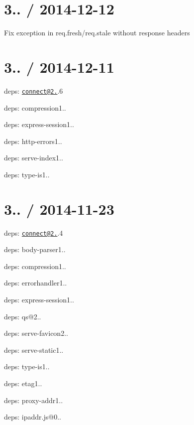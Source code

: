 {\ttfamily \section*{3.. / 2014-\/12-\/12 }}

{\ttfamily }

{\ttfamily 
\begin{DoxyItemize}
\item Fix exception in {\ttfamily req.\+fresh}/{\ttfamily req.\+stale} without response headers
\end{DoxyItemize}}

{\ttfamily \section*{3.. / 2014-\/12-\/11 }}

{\ttfamily }

{\ttfamily 
\begin{DoxyItemize}
\item deps\+: \href{mailto:connect@2.27}{\tt connect@2.}.6
\begin{DoxyItemize}
\item deps\+: compression1..
\item deps\+: express-\/session1..
\item deps\+: http-\/errors1..
\item deps\+: serve-\/index1..
\item deps\+: type-\/is1..
\end{DoxyItemize}
\end{DoxyItemize}}

{\ttfamily \section*{3.. / 2014-\/11-\/23 }}

{\ttfamily }

{\ttfamily 
\begin{DoxyItemize}
\item deps\+: \href{mailto:connect@2.27}{\tt connect@2.}.4
\begin{DoxyItemize}
\item deps\+: body-\/parser1..
\item deps\+: compression1..
\item deps\+: errorhandler1..
\item deps\+: express-\/session1..
\item deps\+: qs@2..
\item deps\+: serve-\/favicon2..
\item deps\+: serve-\/static1..
\item deps\+: type-\/is1..
\end{DoxyItemize}
\item deps\+: etag1..
\item deps\+: proxy-\/addr1..
\begin{DoxyItemize}
\item deps\+: ipaddr.\+js@0..
\end{DoxyItemize}
\end{DoxyItemize}}

